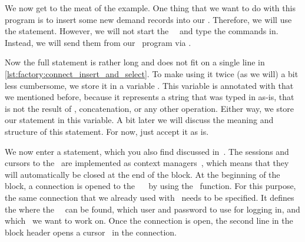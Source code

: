 We now get to the meat of the example.
One thing that we want to do with this program is to insert some new demand records into our \db.
Therefore, we will use the  statement.
However, we will not start the \psql\ \client\ and type the commands in.
Instead, we will send them from our \python\ program via \psycopg.

Now the full  statement is rather long and does not fit on a single line in \cref{lst:factory:connect_insert_and_select}.
To make using it twice (as we will) a bit less cumbersome, we store it in a variable .
This variable is annotated with   that we mentioned before, because it represents a string that was typed in as-is, that is not the result of , concatenation, or any other operation.
Either way, we store our statement in this variable.
A bit later we will discuss the meaning and structure of this statement.
For now, just accept it as is.

We now enter a  statement, which you also find discussed in~\cite{programmingWithPython}.
The sessions and cursors to the \db\ are implemented as context managers~\cite{PSF2024WSCM}, which means that they will automatically be closed at the end of the  block.
At the beginning of the block, a connection  is opened to the \postgresql\ \dbms~\cite{VDGE2022PPDAFP:CC1} by using the ~function.
For this purpose, the same connection  that we already used with \psql\ needs to be specified.
It defines the where the \postgresql\ \server\ can be found, which user and password to use for logging in, and which \db\ we want to work on.
Once the connection is open, the second line in the  block header opens a cursor~\cite{VDGE2022PPDAFP:CC2} in the connection.

